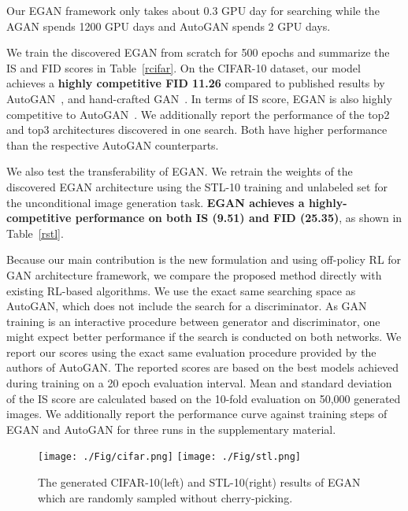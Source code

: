 \documentclass[runningheads]{llncs}
\begin{document}
Our EGAN framework only takes about 0.3 GPU day for searching while the AGAN spends 1200 GPU days and AutoGAN spends 2 GPU days.

We train the discovered EGAN from scratch for 500 epochs and summarize the IS and FID scores in Table~\ref{rcifar}.  On the CIFAR-10 dataset, our model achieves a  \textbf{highly competitive FID 11.26} compared to published results by AutoGAN~\cite{gong2019autogan}, and hand-crafted GAN~\cite{radford2015unsupervised,salimans2016improved,yang2017lr,warde2016improving,he2019probgan,gulrajani2017improved,grinblat2017class,miyato2018spectral,hoang2018mgan,wang2018improving}. In terms of IS score, EGAN is also highly competitive to AutoGAN~\cite{gong2019autogan}. We additionally report the performance of the top2 and top3 architectures discovered in one search. Both have higher performance than the respective AutoGAN counterparts.





We also test the transferability of EGAN. We retrain the weights of the discovered EGAN architecture using the STL-10 training and unlabeled set for the unconditional image generation task. \textbf{EGAN achieves a highly-competitive performance on both IS (9.51) and FID (25.35)}, as shown in Table~\ref{rstl}.


Because our main contribution is the new formulation and using off-policy RL for GAN architecture framework, we compare the proposed method directly with existing RL-based algorithms. We use the exact same searching space as AutoGAN, which does not include the search for a discriminator. As GAN training is an interactive procedure between generator and discriminator, one might expect better performance if the search is conducted on both networks. We report our scores using the exact same evaluation procedure provided by the authors of AutoGAN. The reported scores are based on the best models achieved during training on a 20 epoch evaluation interval. Mean and standard deviation of the IS score are calculated based on the 10-fold evaluation on 50,000 generated images. We additionally report the performance curve against training steps of EGAN and AutoGAN for three runs in the supplementary material.

\begin{figure}[t]
\centering
\texttt{[image: ./Fig/cifar.png]}
\texttt{[image: ./Fig/stl.png]}\caption{The generated CIFAR-10(left) and STL-10(right) results of EGAN which are randomly sampled without cherry-picking.}
\label{fig4}
\end{figure}
\end{document}

